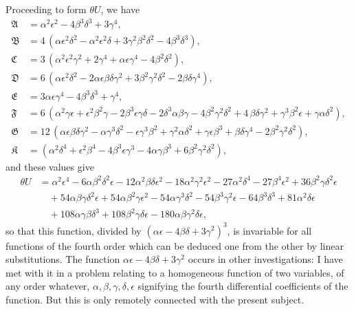 \documentclass[11pt]{article}
\newcommand{\fA}{\mathfrak{A}}
\newcommand{\fB}{\mathfrak{B}}
\newcommand{\fC}{\mathfrak{C}}
\newcommand{\fD}{\mathfrak{D}}
\newcommand{\fE}{\mathfrak{E}}
\newcommand{\fF}{\mathfrak{F}}
\newcommand{\fG}{\mathfrak{G}}
\newcommand{\fK}{\mathfrak{K}}
\begin{document}
Proceeding to form $\theta U$, we have
\[
\begin{aligned}
\fA &= \alpha^2\epsilon^2 - 4\beta^3\delta^3 + 3\gamma^4,\\
\fB &= 4\,(\alpha\epsilon^2\delta^2 - \alpha^2\epsilon^2\delta + 3\gamma^2\beta^2\delta^2 - 4\beta^3\delta^3),\\
\fC &= 3\,(\alpha^2 \epsilon^2 \gamma^2 + 2\gamma^4 + \alpha\epsilon\gamma^4 - 4\beta^2 \delta^2),\\
\fD &= 6\,(\alpha\epsilon^2 \delta^2 - 2\alpha\epsilon\beta\delta\gamma^2 + 3\beta^2\gamma^2\delta^2 - 2\beta\delta\gamma^4),\\
\fE &= 3\alpha\epsilon\gamma^4 - 4\beta^3\delta^3 + \gamma^4,\\
\fF &= 6\,(\alpha^2\gamma\epsilon + \epsilon^2\beta^2\gamma - 2\beta^3\epsilon\gamma\delta - 2\delta^3\alpha\beta\gamma - 4\beta^2\gamma^2\delta^2 + 4\,\beta\delta\gamma^2 + \gamma^3\beta^2\epsilon + \gamma\alpha\delta^2),\\
\fG &= 12\,(\alpha\epsilon\beta\delta\gamma^2 - \alpha\gamma^3\delta^2 - \epsilon\gamma^3\beta^2 + \gamma^2\alpha\delta^2 + \gamma\epsilon\beta^3 + \beta\delta\gamma^4 - 2\beta^2\gamma^2\delta^2),\\
\fK &= (\alpha^2\delta^4 + \epsilon^2\beta^4 - 4\beta^3\epsilon\gamma^3 - 4\alpha\gamma\beta^3 + 6\beta^2\gamma^2\delta^2),
\end{aligned}
\]
and these values give
\[
\begin{aligned}
\theta U &= \alpha^2\epsilon^4 - 6\alpha\beta^2\delta^2\epsilon - 12\alpha^2\beta\delta\epsilon^2 - 18\alpha^2\gamma^2\epsilon^2 - 27\alpha^2\delta^4 - 27\beta^4\epsilon^2 + 36\beta^2\gamma\delta^2\epsilon\\
&\quad + 54\alpha\beta\gamma\delta^2\epsilon + 54\alpha\beta^2\gamma\epsilon^2 - 54\alpha\gamma^3\delta^2 - 54\beta^3\gamma^2\epsilon - 64\beta^3\delta^3 + 81\alpha^2\delta\epsilon\\
&\quad + 108\alpha\gamma\beta\delta^3 + 108\beta^2\gamma\delta\epsilon - 180\alpha\beta\gamma^2\delta\epsilon,
\end{aligned}
\]
so that this function, divided by $(\alpha\epsilon - 4\beta\delta + 3\gamma^2)^3$, is invariable for all functions of the
fourth order which can be deduced one from the other by linear substitutions. The
function $\alpha\epsilon - 4\beta\delta + 3\gamma^2$ occurs in other investigations: I have met with it in a problem
relating to a homogeneous function of two variables, of any order whatever, $\alpha, \beta, \gamma, \delta, \epsilon$
signifying the fourth differential coefficients of the function. But this is only remotely
connected with the present subject.
\end{document}
